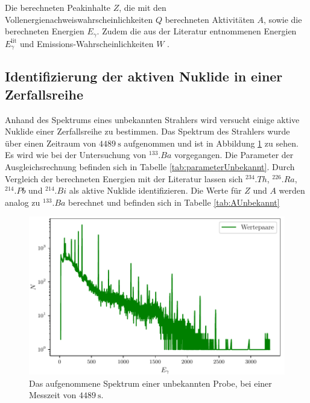 \begin{table}
	\centering
	\caption{Die berechneten Peakinhalte $Z$, die mit den Vollenergienachweiswahrscheinlichkeiten $Q$ berechneten Aktivitäten $A$,  sowie die berechneten Energien $E_\gamma$.  Zudem die aus der Literatur entnommenen Energien $E_\gamma^\text{lit}$ und Emissions-Wahrscheinlichkeiten $W$ \cite{KHAZOV2011855}.}
	
	\label{tab:ABa}
\end{table}

\subsection{Identifizierung der aktiven Nuklide in einer Zerfallsreihe}

Anhand des Spektrums eines unbekannten Strahlers wird versucht einige aktive Nuklide einer Zerfallsreihe zu bestimmen. Das Spektrum des Strahlers wurde über einen Zeitraum von $\SI{4489}{\second}$ aufgenommen und ist in Abbildung \ref{fig:SpektrumUnbekannt} zu sehen. Es wird wie bei der Untersuchung von $^{133}.{Ba}$ vorgegangen. Die Parameter der Ausgleichsrechnung befinden sich in Tabelle \ref{tab:parameterUnbekannt}. Durch Vergleich der berechneten Energien mit der Literatur \cite{V18} lassen sich $^{234}.{Th}$, $^{226}.{Ra}$, $^{214}.{Pb}$ und $^{214}.{Bi}$ als aktive Nuklide identifizieren. Die Werte für $Z$ und $A$ werden analog zu $^{133}.{Ba}$ berechnet und befinden sich in Tabelle \ref{tab:AUnbekannt}

\begin{figure}
	\centering
	\includegraphics[width=\linewidth-60pt,height=\textheight-60pt,keepaspectratio]{content/images/unbekannt.pdf}
	\caption{Das aufgenommene Spektrum einer unbekannten Probe, bei einer Messzeit von $\SI{4489}{\second}$.}
	\label{fig:SpektrumUnbekannt}
\end{figure}

